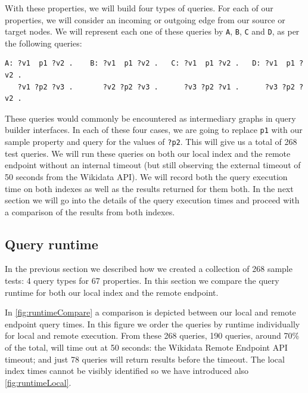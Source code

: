 With these properties, we will build four types of queries. For each of our properties, we will consider an incoming or outgoing edge from our source or target nodes. We will represent each one of these queries by \texttt{A}, \texttt{B}, \texttt{C} and \texttt{D}, as per the following queries: 

\begin{verbatim}
A: ?v1  p1 ?v2 .    B: ?v1  p1 ?v2 .   C: ?v1  p1 ?v2 .   D: ?v1  p1 ?v2 .
   ?v1 ?p2 ?v3 .       ?v2 ?p2 ?v3 .      ?v3 ?p2 ?v1 .      ?v3 ?p2 ?v2 .
\end{verbatim}

These queries would commonly be encountered as intermediary graphs in query builder interfaces. In each of these four cases, we are going to replace \texttt{p1} with our sample property and query for the values of \texttt{?p2}. This will give us a total of 268 test queries. We will run these queries on both our local index and the remote endpoint without an internal timeout (but still observing the external timeout of 50 seconds from the Wikidata API). We will record both the query execution time on both indexes as well as the results returned for them both. In the next section we will go into the details of the query execution times and proceed with a comparison of the results from both indexes.

\subsection{Query runtime}

In the previous section we described how we created a collection of 268 sample tests: 4 query types for 67 properties. In this section we compare the query runtime for both our local index and the remote endpoint.

In \autoref{fig:runtimeCompare} a comparison is depicted between our local and remote endpoint query times. In this figure we order the queries by runtime individually for local and remote execution. From these 268 queries, 190 queries, around 70\% of the total, will time out at 50 seconds: the Wikidata Remote Endpoint API timeout; and just 78 queries will return results before the timeout. The local index times cannot be visibly identified so we have introduced also \autoref{fig:runtimeLocal}.

